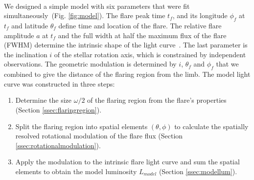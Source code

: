 \documentclass[fleqn,usenatbib,letters]{mnras}%
\begin{document}
\\
We designed a simple model with six parameters that were fit simultaneously~(Fig. \ref{fig:model}). The flare peak time $t_f$, and its longitude $\phi_f$ at $t_f$ and latitude $\theta_f$ define time and location of the flare. The relative flare amplitude $a$ at $t_f$ and the full width at half the maximum flux of the flare (FWHM) determine the intrinsic shape of the light curve~\citep{davenport2014}. The last parameter is the inclination $i$ of the stellar rotation axis, which is constrained by independent observations. The geometric modulation is determined by $i$, $\theta_f$ and $\phi_f$ that we combined to give the distance of the flaring region from the limb. The model light curve was constructed in three steps:
\begin{enumerate}
    \item Determine the size $\omega/2$ of the flaring region from the flare's properties (Section \ref{ssec:flaringregion}). %
    \item Split the flaring region into spatial elements $(\theta, \phi)$ to calculate the spatially resolved rotational modulation of the flare flux (Section \ref{ssec:rotationalmodulation}).
    \item Apply the modulation to the intrinsic flare light curve and sum the spatial elements to obtain the model luminosity $L_{model}$ (Section \ref{ssec:modellum}).
\end{enumerate}
\end{document}
